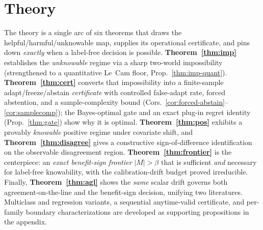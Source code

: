 \documentclass[conference]{IEEEtran}
\theoremstyle{plain}
\theoremstyle{definition}
\begin{document}
\begin{center}\end{center}

\section{Theory}
The theory is a single arc of six theorems that draws the helpful/harmful/unknowable map,
supplies its operational certificate, and pins down \emph{exactly} when a label-free decision is
possible. \textbf{Theorem~\ref{thm:imp}} establishes the \emph{unknowable} regime via a sharp
two-world impossibility (strengthened to a quantitative Le~Cam floor, Prop.~\ref{thm:imp-quant}).
\textbf{Theorem~\ref{thm:cert}} converts that impossibility into a finite-sample
adapt/freeze/abstain \emph{certificate} with controlled false-adapt rate, forced abstention, and a
sample-complexity bound (Cors.~\ref{cor:forced-abstain}--\ref{cor:samplecomp}); the Bayes-optimal
gate and an exact plug-in regret identity (Prop.~\ref{thm:gate}) show why it is optimal.
\textbf{Theorem~\ref{thm:pos}} exhibits a provably \emph{knowable} positive regime under
covariate shift, and \textbf{Theorem~\ref{thm:disagree}} gives a constructive sign-of-difference
identification on the observable disagreement region. \textbf{Theorem~\ref{thm:frontier}} is the
centerpiece: an \emph{exact benefit-sign frontier} $|M|>\beta$ that is sufficient \emph{and}
necessary for label-free knowability, with the calibration-drift budget proved irreducible.
Finally, \textbf{Theorem~\ref{thm:agl}} shows the \emph{same} scalar drift governs both
agreement-on-the-line and the benefit-sign decision, unifying two literatures. Multiclass and
regression variants, a sequential anytime-valid certificate, and per-family boundary
characterizations are developed as supporting propositions in the appendix.
\end{document}

